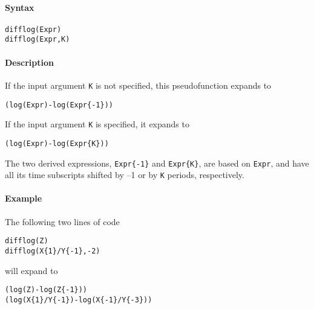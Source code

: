 


	\paragraph{Syntax}\label{syntax}

\begin{verbatim}
difflog(Expr)
difflog(Expr,K)
\end{verbatim}

\paragraph{Description}\label{description}

If the input argument \texttt{K} is not specified, this pseudofunction
expands to

\begin{verbatim}
(log(Expr)-log(Expr{-1}))
\end{verbatim}

If the input argument \texttt{K} is specified, it expands to

\begin{verbatim}
(log(Expr)-log(Expr{K}))
\end{verbatim}

The two derived expressions, \texttt{Expr\{-1\}} and \texttt{Expr\{K\}},
are based on \texttt{Expr}, and have all its time subscripts shifted by
--1 or by \texttt{K} periods, respectively.

\paragraph{Example}\label{example}

The following two lines of code

\begin{verbatim}
difflog(Z)
difflog(X{1}/Y{-1},-2)
\end{verbatim}

will expand to

\begin{verbatim}
(log(Z)-log(Z{-1}))
(log(X{1}/Y{-1})-log(X{-1}/Y{-3}))
\end{verbatim}


